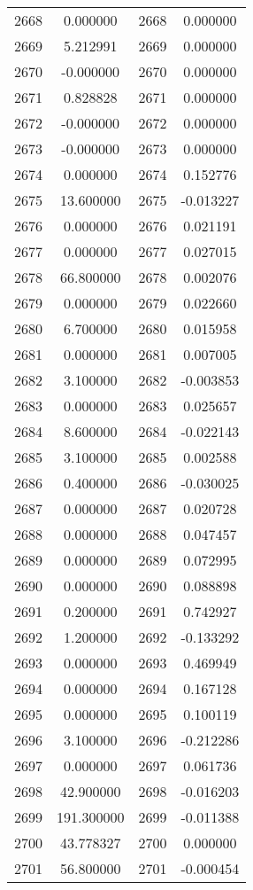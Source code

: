 \documentclass[12pt]{article}
\begin{document}
\begin{longtable}{@{}cccc@{}}
2668 & 0.000000 & 2668 & 0.000000 \\
2669 & 5.212991 & 2669 & 0.000000 \\
2670 & -0.000000 & 2670 & 0.000000 \\
2671 & 0.828828 & 2671 & 0.000000 \\
2672 & -0.000000 & 2672 & 0.000000 \\
2673 & -0.000000 & 2673 & 0.000000 \\
2674 & 0.000000 & 2674 & 0.152776 \\
2675 & 13.600000 & 2675 & -0.013227 \\
2676 & 0.000000 & 2676 & 0.021191 \\
2677 & 0.000000 & 2677 & 0.027015 \\
2678 & 66.800000 & 2678 & 0.002076 \\
2679 & 0.000000 & 2679 & 0.022660 \\
2680 & 6.700000 & 2680 & 0.015958 \\
2681 & 0.000000 & 2681 & 0.007005 \\
2682 & 3.100000 & 2682 & -0.003853 \\
2683 & 0.000000 & 2683 & 0.025657 \\
2684 & 8.600000 & 2684 & -0.022143 \\
2685 & 3.100000 & 2685 & 0.002588 \\
2686 & 0.400000 & 2686 & -0.030025 \\
2687 & 0.000000 & 2687 & 0.020728 \\
2688 & 0.000000 & 2688 & 0.047457 \\
2689 & 0.000000 & 2689 & 0.072995 \\
2690 & 0.000000 & 2690 & 0.088898 \\
2691 & 0.200000 & 2691 & 0.742927 \\
2692 & 1.200000 & 2692 & -0.133292 \\
2693 & 0.000000 & 2693 & 0.469949 \\
2694 & 0.000000 & 2694 & 0.167128 \\
2695 & 0.000000 & 2695 & 0.100119 \\
2696 & 3.100000 & 2696 & -0.212286 \\
2697 & 0.000000 & 2697 & 0.061736 \\
2698 & 42.900000 & 2698 & -0.016203 \\
2699 & 191.300000 & 2699 & -0.011388 \\
2700 & 43.778327 & 2700 & 0.000000 \\
2701 & 56.800000 & 2701 & -0.000454 \\

\end{longtable}
\end{document}
